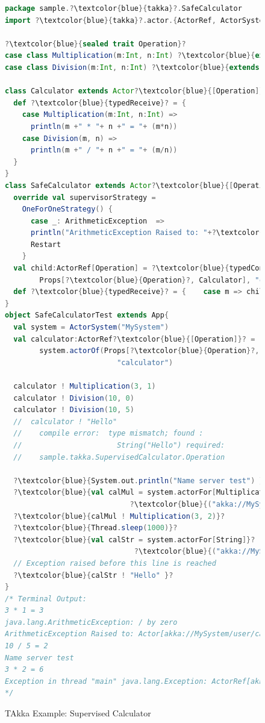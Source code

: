 \begin{figure}[p]
    \begin{lstlisting}[language=scala, escapechar=?]
package sample.?\textcolor{blue}{takka}?.SafeCalculator
import ?\textcolor{blue}{takka}?.actor.{ActorRef, ActorSystem, Props, Actor}

?\textcolor{blue}{sealed trait Operation}?
case class Multiplication(m:Int, n:Int) ?\textcolor{blue}{extends Operation}?
case class Division(m:Int, n:Int) ?\textcolor{blue}{extends Operation}?

class Calculator extends Actor?\textcolor{blue}{[Operation]}?{
  def ?\textcolor{blue}{typedReceive}? = {
    case Multiplication(m:Int, n:Int) =>
      println(m +" * "+ n +" = "+ (m*n))    
    case Division(m, n) =>
      println(m +" / "+ n +" = "+ (m/n))
  }
}
class SafeCalculator extends Actor?\textcolor{blue}{[Operation]}? {
  override val supervisorStrategy =
    OneForOneStrategy() {
      case _: ArithmeticException  =>
      println("ArithmeticException Raised to: "+?\textcolor{blue}{typedSelf}?)
      Restart
    }
  val child:ActorRef[Operation] = ?\textcolor{blue}{typedContext}?.actorOf(
  		Props[?\textcolor{blue}{Operation}?, Calculator], "child")
  def ?\textcolor{blue}{typedReceive}? = {    case m => child ! m  }
}
object SafeCalculatorTest extends App{
  val system = ActorSystem("MySystem")
  val calculator:ActorRef?\textcolor{blue}{[Operation]}? = 
        system.actorOf(Props[?\textcolor{blue}{Operation}?, SafeCalculator], 
                          "calculator")
                          
  calculator ! Multiplication(3, 1)
  calculator ! Division(10, 0)
  calculator ! Division(10, 5)                          
  //  calculator ! "Hello" 
  //    compile error:  type mismatch; found : 
  //                      String("Hello") required: 
  //    sample.takka.SupervisedCalculator.Operation
  
  ?\textcolor{blue}{System.out.println("Name server test") }?
  ?\textcolor{blue}{val calMul = system.actorFor[Multiplication]}?
                             ?\textcolor{blue}{("akka://MySystem/user/calculator")}?
  ?\textcolor{blue}{calMul ! Multiplication(3, 2)}?
  ?\textcolor{blue}{Thread.sleep(1000)}?
  ?\textcolor{blue}{val calStr = system.actorFor[String]}?
                              ?\textcolor{blue}{("akka://MySystem/user/calculator")}?
  // Exception raised before this line is reached                              
  ?\textcolor{blue}{calStr ! "Hello" }?
}
/* Terminal Output:
3 * 1 = 3
java.lang.ArithmeticException: / by zero
ArithmeticException Raised to: Actor[akka://MySystem/user/calculator]
10 / 5 = 2
Name server test
3 * 2 = 6
Exception in thread "main" java.lang.Exception: ActorRef[akka://MySystem/user/calculator] does not exist or does not have type ActorRef[String]
*/
    \end{lstlisting}
    \caption{TAkka Example: Supervised Calculator}
  \vspace*{1 in}    
    \label{takka:supervisedcalculator}
\end{figure}





